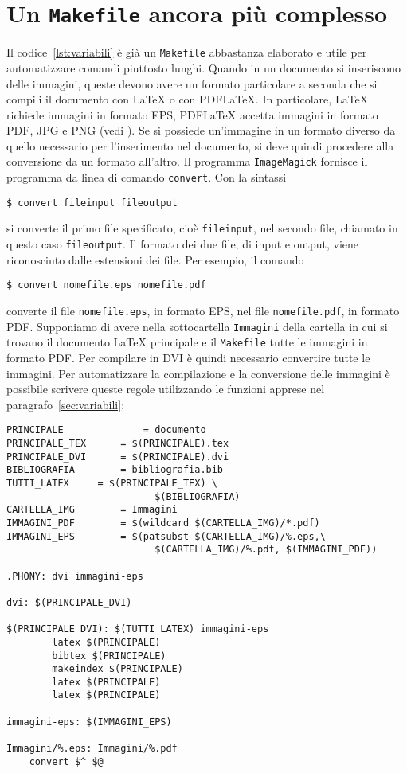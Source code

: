 \section{Un \texttt{Makefile} ancora più complesso}
\label{sec:make-complesso}

Il codice~\ref{lst:variabili} è già un \texttt{Makefile} abbastanza elaborato e
utile per automatizzare comandi piuttosto lunghi.  Quando in un documento si
inseriscono delle immagini, queste devono avere un formato particolare a seconda
che si compili il documento con \LaTeX{}
o con \textsc{PDF}\LaTeX.  In particolare, \LaTeX{}
richiede immagini in formato \textsc{EPS}, \textsc{PDF}\LaTeX{}
accetta immagini in formato \textsc{PDF}, \textsc{JPG} e \textsc{PNG} (vedi
\textcite[105]{pantieri:latex}).  Se si possiede un'immagine in un formato
diverso da quello necessario per l'inserimento nel documento, si deve quindi
procedere alla conversione da un formato all'altro.  Il programma
\texttt{ImageMagick} fornisce il programma da linea di comando
\texttt{convert}. Con la sintassi
\begin{verbatim}
$ convert fileinput fileoutput
\end{verbatim} %
si converte il primo file specificato, cioè \texttt{fileinput}, nel secondo
file, chiamato in questo caso \texttt{fileoutput}.  Il formato dei due file, di
input e output, viene riconosciuto dalle estensioni dei file.  Per esempio, il
comando
\begin{verbatim}
$ convert nomefile.eps nomefile.pdf
\end{verbatim} %
converte il file \texttt{nomefile.eps}, in formato \textsc{EPS}, nel file
\texttt{nomefile.pdf}, in formato \textsc{PDF}.  Supponiamo di avere nella
sottocartella \texttt{Immagini} della cartella in cui si trovano il documento
\LaTeX{}
principale e il \texttt{Makefile} tutte le immagini in formato \textsc{PDF}.
Per compilare in \textsc{DVI} è quindi necessario convertire tutte le immagini.
Per automatizzare la compilazione e la conversione delle immagini è possibile
scrivere queste regole utilizzando le funzioni apprese nel
paragrafo~\ref{sec:variabili}:
\begin{lstlisting}[caption={\texttt{Makefile} in cui le immagini \textsc{PDF}
vengono convertite in \textsc{EPS} nella compilazione con \LaTeX.},label=lst:pdf-eps]
PRINCIPALE              = documento
PRINCIPALE_TEX		= $(PRINCIPALE).tex
PRINCIPALE_DVI		= $(PRINCIPALE).dvi
BIBLIOGRAFIA		= bibliografia.bib
TUTTI_LATEX		= $(PRINCIPALE_TEX) \
                          $(BIBLIOGRAFIA)
CARTELLA_IMG		= Immagini
IMMAGINI_PDF		= $(wildcard $(CARTELLA_IMG)/*.pdf)
IMMAGINI_EPS		= $(patsubst $(CARTELLA_IMG)/%.eps,\
                          $(CARTELLA_IMG)/%.pdf, $(IMMAGINI_PDF))

.PHONY: dvi immagini-eps

dvi: $(PRINCIPALE_DVI)

$(PRINCIPALE_DVI): $(TUTTI_LATEX) immagini-eps
        latex $(PRINCIPALE)
        bibtex $(PRINCIPALE)
        makeindex $(PRINCIPALE)
        latex $(PRINCIPALE)
        latex $(PRINCIPALE)

immagini-eps: $(IMMAGINI_EPS)

Immagini/%.eps: Immagini/%.pdf
	convert $^ $@
\end{lstlisting} %
